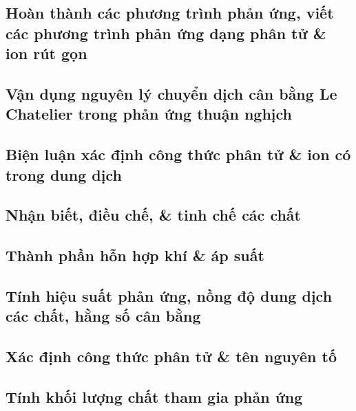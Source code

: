 \documentclass{article}
\numberwithin{equation}{section}
\begin{document}

\subsection{Hoàn thành các phương trình phản ứng, viết các phương trình phản ứng dạng phân tử \& ion rút gọn}


\subsection{Vận dụng nguyên lý chuyển dịch cân bằng Le Chatelier trong phản ứng thuận nghịch}


\subsection{Biện luận xác định công thức phân tử \& ion có trong dung dịch}


\subsection{Nhận biết, điều chế, \& tinh chế các chất}


\subsection{Thành phần hỗn hợp khí \& áp suất}


\subsection{Tính hiệu suất phản ứng, nồng độ dung dịch các chất, hằng số cân bằng}


\subsection{Xác định công thức phân tử \& tên nguyên tố}


\subsection{Tính khối lượng chất tham gia phản ứng}


\printbibliography[heading=bibintoc]
	
\end{document}
